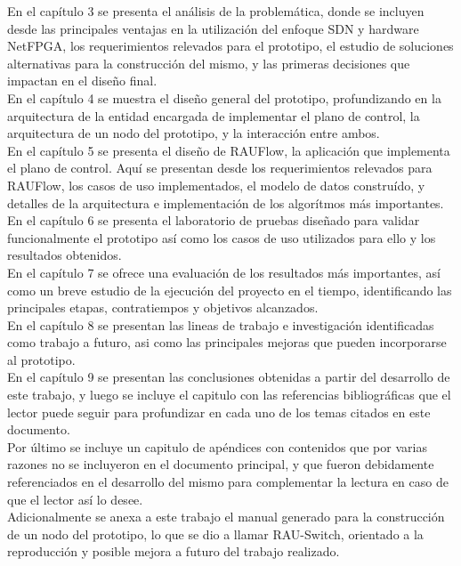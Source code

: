 En el cap\'itulo 3 se presenta el análisis de la problemática, donde se incluyen desde las principales ventajas en la utilización del enfoque SDN y hardware NetFPGA, los requerimientos relevados para el prototipo, el estudio de soluciones alternativas para la construcción del mismo, y las primeras decisiones que impactan en el diseño final.\\

En el cap\'itulo 4 se muestra el diseño general del prototipo, profundizando en la arquitectura de la entidad encargada de implementar el plano de control, la arquitectura de un nodo del prototipo, y la interacción entre ambos.\\

En el cap\'itulo 5 se presenta el diseño de RAUFlow, la aplicaci\'on que implementa el plano de control. Aquí se presentan desde los requerimientos relevados para RAUFlow, los casos de uso implementados, el modelo de datos constru\'ido, y detalles de la arquitectura e implementaci\'on de los algor\'itmos m\'as importantes.\\

En el cap\'itulo 6 se presenta el laboratorio de pruebas diseñado para validar funcionalmente el prototipo as\'i como los casos de uso utilizados para ello y los resultados obtenidos.\\

En el cap\'itulo 7 se ofrece una evaluación de los resultados m\'as importantes, así como un breve estudio de la ejecuci\'on del proyecto en el tiempo, identificando las principales etapas, contratiempos y objetivos alcanzados.\\

En el cap\'itulo 8 se presentan las lineas de trabajo e investigaci\'on identificadas como trabajo a futuro, asi como las principales mejoras que pueden incorporarse al prototipo.\\

En el cap\'itulo 9 se presentan las conclusiones obtenidas a partir del desarrollo de este trabajo, y luego se incluye el capitulo con las referencias bibliográficas que el lector puede seguir para profundizar en cada uno de los temas citados en este documento.\\

Por \'ultimo se incluye un capitulo de ap\'endices con contenidos que por varias razones no se incluyeron en el documento principal, y que fueron debidamente referenciados en el desarrollo del mismo para complementar la lectura en caso de que el lector así lo desee.\\

Adicionalmente se anexa a este trabajo el manual generado para la construcci\'on de un nodo del prototipo, lo que se dio a llamar RAU-Switch, orientado a la reproducci\'on y posible mejora a futuro del trabajo realizado.

 

